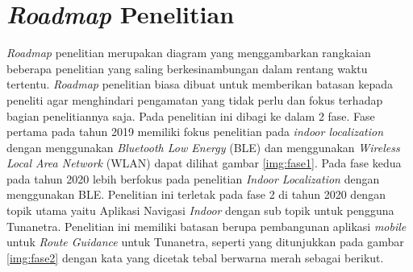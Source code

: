 \newpage
\section{\textit{Roadmap} Penelitian}
\textit{Roadmap} penelitian merupakan diagram yang menggambarkan rangkaian beberapa penelitian yang saling berkesinambungan dalam rentang waktu tertentu. \textit{Roadmap} penelitian biasa dibuat untuk memberikan batasan kepada peneliti agar menghindari pengamatan yang tidak perlu dan fokus terhadap bagian penelitiannya saja. Pada penelitian ini dibagi ke dalam 2 fase. Fase pertama pada tahun 2019 memiliki fokus penelitian pada \textit{indoor localization} dengan menggunakan \textit{Bluetooth Low Energy} (BLE) dan menggunakan \textit{Wireless Local Area Network} (WLAN) dapat dilihat gambar \ref{img:fase1}. Pada fase kedua pada tahun 2020 lebih berfokus pada penelitian \textit{Indoor Localization} dengan menggunakan BLE. Penelitian ini terletak pada fase 2 di tahun 2020 dengan topik utama yaitu Aplikasi Navigasi \textit{Indoor} dengan sub topik untuk pengguna Tunanetra. Penelitian ini memiliki batasan berupa pembangunan aplikasi \textit{mobile} untuk \textit{Route Guidance} untuk Tunanetra, seperti yang ditunjukkan pada gambar \ref{img:fase2} dengan kata yang dicetak tebal berwarna merah sebagai berikut.


\begin{figure}[H]
\end{figure}

